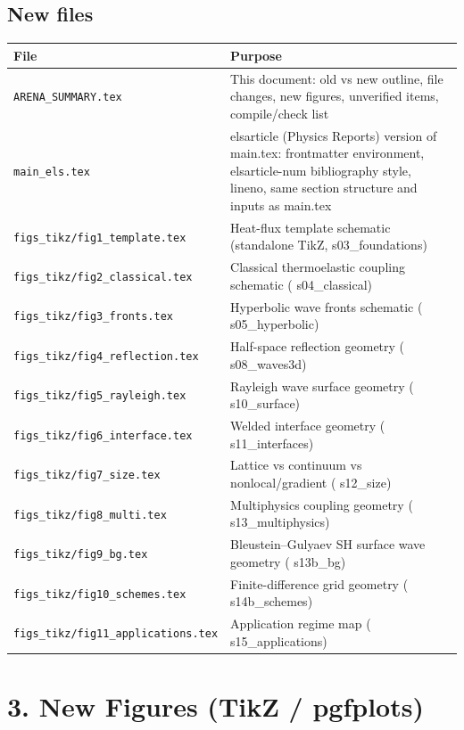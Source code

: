 \documentclass[12pt,a4paper]{article}
\begin{document}
\subsection*{New files}
\begin{tabularx}{\textwidth}{@{}lX@{}}\toprule
\textbf{File} & \textbf{Purpose}\\\midrule
{\tt ARENA\_SUMMARY.tex} & This document: old vs new outline, file changes, new figures, unverified items, compile/check list\\
{\tt main\_els.tex} & elsarticle (Physics Reports) version of main.tex: frontmatter environment, elsarticle-num bibliography style, lineno, same section structure and inputs as main.tex\\
{\tt figs\_tikz/fig1\_template.tex} & Heat-flux template schematic (standalone TikZ,  s03\_foundations)\\
{\tt figs\_tikz/fig2\_classical.tex} & Classical thermoelastic coupling schematic ( s04\_classical)\\
{\tt figs\_tikz/fig3\_fronts.tex} & Hyperbolic wave fronts schematic ( s05\_hyperbolic)\\
{\tt figs\_tikz/fig4\_reflection.tex} & Half-space reflection geometry ( s08\_waves3d)\\
{\tt figs\_tikz/fig5\_rayleigh.tex} & Rayleigh wave surface geometry ( s10\_surface)\\
{\tt figs\_tikz/fig6\_interface.tex} & Welded interface geometry ( s11\_interfaces)\\
{\tt figs\_tikz/fig7\_size.tex} & Lattice vs continuum vs nonlocal/gradient ( s12\_size)\\
{\tt figs\_tikz/fig8\_multi.tex} & Multiphysics coupling geometry ( s13\_multiphysics)\\
{\tt figs\_tikz/fig9\_bg.tex} & Bleustein--Gulyaev SH surface wave geometry ( s13b\_bg)\\
{\tt figs\_tikz/fig10\_schemes.tex} & Finite-difference grid geometry ( s14b\_schemes)\\
{\tt figs\_tikz/fig11\_applications.tex} & Application regime map ( s15\_applications)\\
\bottomrule
\end{tabularx}

\section*{3. New Figures (TikZ / pgfplots)}
\end{document}
